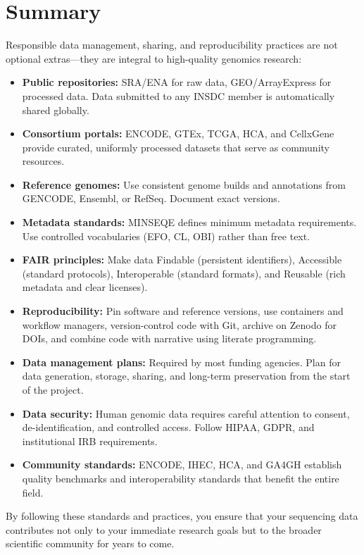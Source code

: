 \section{Summary}
\label{sec:datastandards:summary}

Responsible data management, sharing, and reproducibility practices are not optional extras---they are integral to high-quality genomics research:

\begin{itemize}[itemsep=2pt]
  \item \textbf{Public repositories:} SRA/ENA for raw data, GEO/ArrayExpress for processed data. Data submitted to any INSDC member is automatically shared globally.
  \item \textbf{Consortium portals:} ENCODE, GTEx, TCGA, HCA, and CellxGene provide curated, uniformly processed datasets that serve as community resources.
  \item \textbf{Reference genomes:} Use consistent genome builds and annotations from GENCODE, Ensembl, or RefSeq. Document exact versions.
  \item \textbf{Metadata standards:} MINSEQE defines minimum metadata requirements. Use controlled vocabularies (EFO, CL, OBI) rather than free text.
  \item \textbf{FAIR principles:} Make data Findable (persistent identifiers), Accessible (standard protocols), Interoperable (standard formats), and Reusable (rich metadata and clear licenses).
  \item \textbf{Reproducibility:} Pin software and reference versions, use containers and workflow managers, version-control code with Git, archive on Zenodo for DOIs, and combine code with narrative using literate programming.
  \item \textbf{Data management plans:} Required by most funding agencies. Plan for data generation, storage, sharing, and long-term preservation from the start of the project.
  \item \textbf{Data security:} Human genomic data requires careful attention to consent, de-identification, and controlled access. Follow HIPAA, GDPR, and institutional IRB requirements.
  \item \textbf{Community standards:} ENCODE, IHEC, HCA, and GA4GH establish quality benchmarks and interoperability standards that benefit the entire field.
\end{itemize}

By following these standards and practices, you ensure that your sequencing data contributes not only to your immediate research goals but to the broader scientific community for years to come.
